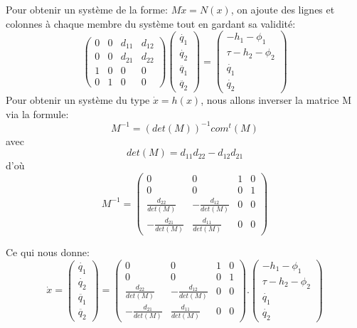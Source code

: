 \documentclass[a4paper,12pt]{report}
\begin{document}
Pour obtenir un système de la forme: $M\dot{x}=N(x)$, on ajoute des lignes et colonnes à chaque membre du système tout en gardant sa validité:
$$
    \begin{pmatrix}
    0 & 0 & d_{11} & d_{12} \\
    0 & 0 & d_{21} & d_{22} \\
    1 & 0 & 0 & 0 \\
    0 & 1 & 0 & 0
    \end{pmatrix}
    \begin{pmatrix}
    \dot{q_1} \\
    \dot{q_2} \\
    \ddot{q_1} \\
    \ddot{q_2}
    \end{pmatrix}
    =
    \begin{pmatrix}
    -h_1 - \phi_1 \\
    \tau -h_2 - \phi_2 \\
    \dot{q_1} \\
    \dot{q_2}
    \end{pmatrix}
$$
Pour obtenir un système du type $ \dot{x} = h(x) $, nous allons inverser la matrice M via la formule:
$$ M^{-1} = (det(M))^{-1} com^t (M) $$
avec $$ det(M) = d_{11}d_{22} - d_{12}d_{21} $$
d'où
$$
    M^{-1}
    =
    \begin{pmatrix}
    0 & 0 & 1 & 0 \\
    0 & 0 & 0 & 1 \\
    \frac{d_{22}}{det(M)} & -\frac{d_{12}}{det(M)} & 0 & 0 \\
    -\frac{d_{21}}{det(M)} & \frac{d_{11}}{det(M)} & 0 & 0
    \end{pmatrix}
$$

Ce qui nous donne:
$$
    \dot{x}
    =
    \begin{pmatrix}
    \dot{q_1} \\
    \dot{q_2} \\
    \ddot{q_1} \\
    \ddot{q_2}
    \end{pmatrix}
    =
    \begin{pmatrix}
    0 & 0 & 1 & 0 \\
    0 & 0 & 0 & 1 \\
    \frac{d_{22}}{det(M)} & -\frac{d_{12}}{det(M)} & 0 & 0 \\
    -\frac{d_{21}}{det(M)} & \frac{d_{11}}{det(M)} & 0 & 0
    \end{pmatrix}
    .
    \begin{pmatrix}
    -h_1 - \phi_1 \\
    \tau -h_2 - \phi_2 \\
    \dot{q_1} \\
    \dot{q_2}
    \end{pmatrix}
$$
\end{document}
